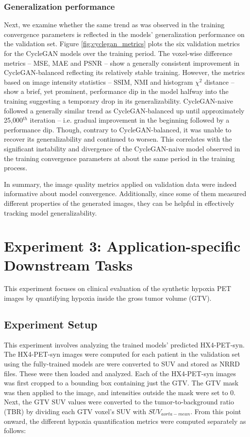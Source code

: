\subsubsection{Generalization performance} 
Next, we examine whether the same trend as was observed in the training convergence parameters is reflected in the models' generalization performance on the validation set. Figure \ref{fig:cyclegan_metrics} plots the six validation metrics for the CycleGAN models over the training period. The voxel-wise difference metrics -- MSE, MAE and PSNR -- show a generally consistent improvement in CycleGAN-balanced reflecting its relatively stable training. However, the metrics based on image intensity statistics -- SSIM, NMI and histogram $\chi^2$ distance -- show a brief, yet prominent, performance dip in the model halfway into the training suggesting a temporary drop in its generalizability. CycleGAN-naive followed a generally similar trend as CycleGAN-balanced up until approximately 25,000$^{th}$ iteration -- i.e. gradual improvement in the beginning followed by a performance dip. Though, contrary to CycleGAN-balanced, it was unable to recover its generalizability and continued to worsen. This correlates with the significant instability and divergence of the CycleGAN-naive model observed in the training convergence parameters at about the same period in the training process.

In summary, the image quality metrics applied on validation data were indeed informative about model convergence. Additionally, since some of them measured different properties of the generated images, they can be helpful in effectively tracking model generalizability.



\section{Experiment 3: Application-specific Downstream Tasks}
\label{Expt_3}
This experiment focuses on clinical evaluation of the synthetic hypoxia PET images by quantifying hypoxia inside the gross tumor volume (GTV).


\subsection{Experiment Setup}
This experiment involves analyzing the trained models' predicted HX4-PET-syn. The HX4-PET-syn images were computed for each patient in the validation set using the fully-trained models are were converted to SUV and stored as NRRD files. These were then loaded and analyzed. Each of the HX4-PET-syn images was first cropped to a bounding box containing just the GTV. The GTV mask was then applied to the image, and intensities outside the mask were set to 0. Next, the GTV SUV values were converted to the tumor-to-background ratio (TBR) by dividing each GTV voxel's SUV with $SUV_{aorta-mean}$. From this point onward, the different hypoxia quantification metrics were computed separately as follows:

